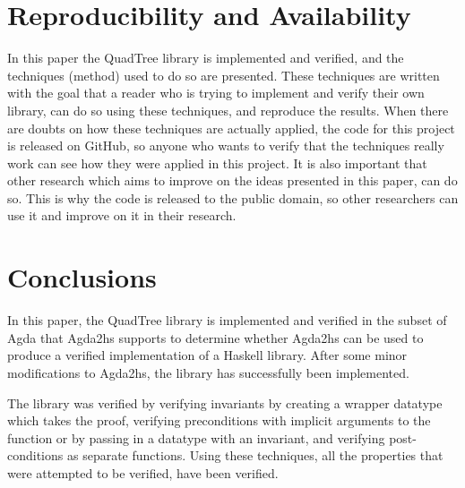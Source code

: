 \section{Reproducibility and Availability}
In this paper the QuadTree library is implemented and verified, and the techniques (method) used to do so are presented. These techniques are written with the goal that a reader who is trying to implement and verify their own library, can do so using these techniques, and reproduce the results. When there are doubts on how these techniques are actually applied, the code for this project is released on GitHub, so anyone who wants to verify that the techniques really work can see how they were applied in this project. It is also important that other research which aims to improve on the ideas presented in this paper, can do so. This is why the code is released to the public domain, so other researchers can use it and improve on it in their research.

\section{Conclusions}
In this paper, the QuadTree library is implemented and verified in the subset of Agda that Agda2hs supports to determine whether Agda2hs can be used to produce a verified implementation of a Haskell library. After some minor modifications to Agda2hs, the library has successfully been implemented. 

The library was verified by verifying invariants by creating a wrapper datatype which takes the proof, verifying preconditions with implicit arguments to the function or by passing in a datatype with an invariant, and verifying post-conditions as separate functions.  Using these techniques, all the properties that were attempted to be verified, have been verified.

